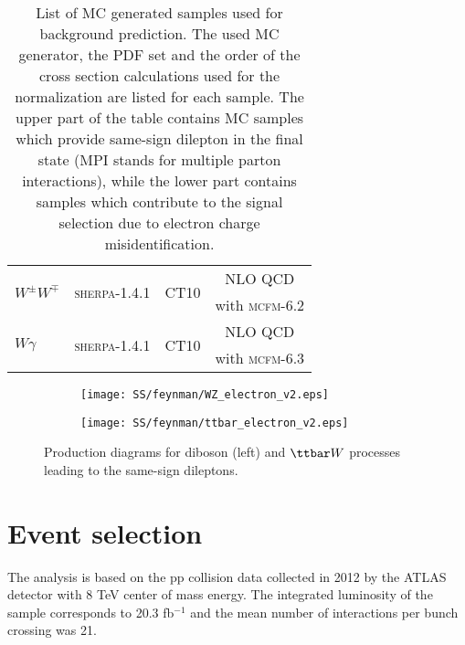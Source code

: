 \begin{table}[ht]
\begin{center}
\begin{tabular}{l|c|c|c}
\multirow{2}{*}{$W^{\pm}W^{\mp}$} & \multirow{2}{*}{{\scshape sherpa-1.4.1}} & \multirow{2}{*}{CT10}& NLO QCD \\
& &  & with {\scshape mcfm-6.2}\\
\hline
\multirow{2}{*}{$W\gamma$} & \multirow{2}{*}{{\scshape sherpa}-1.4.1} & \multirow{2}{*}{CT10}& NLO QCD\\
& &  & with {\scshape mcfm-6.3}\\
\hline
\end{tabular}
\end{center}
  \caption{List of MC generated samples used for background prediction. 
  The used MC generator, the PDF set and the order of the cross section calculations used for the normalization are listed for each sample.
  The upper part of the table contains MC samples which provide same-sign dilepton in the final state
  (MPI stands for multiple parton interactions), 
  while the lower part contains samples which contribute to the signal selection due to electron charge misidentification.}
\label{tab:MC_cross}
\end{table}

\begin{figure}

\begin{subfigure}{.5\textwidth}
  \centering
  \texttt{[image: SS/feynman/WZ\_electron\_v2.eps]}
\end{subfigure}%
\begin{subfigure}{.5\textwidth}
  \centering
  \texttt{[image: SS/feynman/ttbar\_electron\_v2.eps]}
\end{subfigure}

\caption{Production diagrams for diboson (left) and $\ttbar W$ processes leading to the same-sign dileptons.}
  \label{fig:prompt_bkg_feynman_diag}
\end{figure}

\section{Event selection}

The analysis is based on the pp collision data collected in 2012 by the ATLAS detector with 8 TeV center of mass energy.
The integrated luminosity of the sample corresponds to 20.3 fb$^{-1}$ and the mean number of interactions per bunch crossing was 21.

